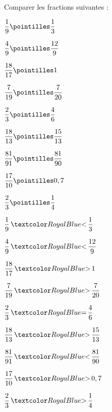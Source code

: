\begin{Maquette}[Fiche,CorrigeFin,Colonnes=2]{}
\begin{multicols}{2}
      \begin{exercice}[SLF] %
         Comparer les fractions suivantes : \medskip
         \begin{colenumerate}[3]
            \item $\dfrac{1}{9} \pointilles \dfrac{1}{3}$ \bigskip
            \item $\dfrac{4}{9} \pointilles \dfrac{12}{9}$ \bigskip
            \item $\dfrac{18}{17} \pointilles 1$ \bigskip
            \item $\dfrac{7}{19} \pointilles \dfrac{7}{20}$ \bigskip
            \item $\dfrac{2}{3} \pointilles \dfrac{4}{6}$ \bigskip
            \item $\dfrac{18}{13} \pointilles \dfrac{15}{13}$ \bigskip
            \item $\dfrac{81}{91} \pointilles \dfrac{81}{90}$ \bigskip
            \item $\dfrac{17}{10} \pointilles 0,7$ \bigskip
            \item $\dfrac{2}{3} \pointilles \dfrac{1}{4}$ \bigskip
         \end{colenumerate}
      \end{exercice}
      
      \begin{Solution}
         \begin{colenumerate}[3]
            \item $\dfrac{1}{9} \, \cor{<} \, \dfrac{1}{3}$ \medskip
            \item $\dfrac{4}{9} \, \cor{<} \,\dfrac{12}{9}$ \medskip
            \item $\dfrac{18}{17} \, \cor{>} \,1$
            \item $\dfrac{7}{19} \, \cor{>} \,\dfrac{7}{20}$
            \item $\dfrac{2}{3} \, \cor{=} \,\dfrac{4}{6}$
            \item $\dfrac{18}{13} \, \cor{>} \,\dfrac{15}{13}$
            \item $\dfrac{81}{91} \, \cor{<} \,\dfrac{81}{90}$
            \item $\dfrac{17}{10} \, \cor{>} \,0,7$
            \item $\dfrac{2}{3} \, \cor{>} \,\dfrac{1}{4}$
         \end{colenumerate}
      \end{Solution}
           

\end{multicols}
\end{Maquette}

